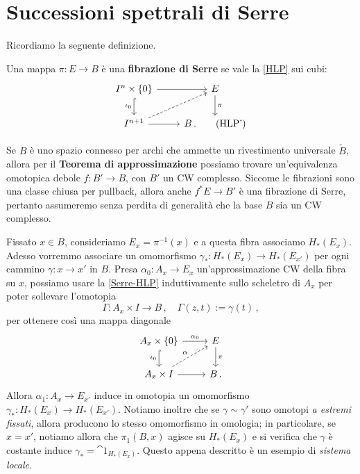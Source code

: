 \section{Successioni spettrali di Serre}

Ricordiamo la seguente definizione.

\begin{df}
	Una mappa $\pi : E \to B$ è una \textbf{fibrazione di Serre} se
	vale la \eqref{HLP} sui cubi:
	\begin{equation}\label{Serre-HLP}
		\begin{tikzcd}
			I^{n} \times \{0\} \ar[r] \ar[d, "\iota_{0}"', hook] & E \ar[d, "\pi"] \\
			I^{n+1} \ar[r] \ar[ur, dashed] & B\,. \tag{HLP'}
		\end{tikzcd}
	\end{equation}
\end{df}

Se $B$ è uno spazio connesso per archi che ammette un rivestimento universale $\widetilde{B}$,
allora per il \textbf{Teorema di approssimazione} possiamo trovare un'equivalenza
omotopica debole $f: B' \to B$, con $B'$ un CW complesso. Siccome le fibrazioni
sono una classe chiusa per pullback, allora anche $f^{*}E \to B'$ 
è una fibrazione di Serre, pertanto assumeremo 
senza perdita di generalità che la base $B$ sia un CW complesso.

Fissato $x \in B$, consideriamo  $E_{x} = \pi^{-1}(x)$ e
a questa fibra associamo $H_{*}(E_{x})$. 
Adesso vorremmo associare un omomorfismo 
$\gamma_{*} : H_{*}(E_{x}) \to H_{*}(E_{x'})$
per ogni cammino
$\gamma : x \to x'$ in $B$. 
Presa $\alpha_{0} : A_{x} \to E_{x}$ un'approssimazione CW della fibra su $x$,
possiamo usare la \eqref{Serre-HLP} induttivamente sullo scheletro di $A_{x}$
per poter sollevare l'omotopia 
\begin{equation*}
	\Gamma: A_{x} \times I \longrightarrow B\,, \quad
	\Gamma(z,t) := \gamma(t)\,,
\end{equation*}
per ottenere così una mappa diagonale
\begin{equation*}
	\begin{tikzcd}
		A_{x} \times \{0\} \ar[r, "\alpha_{0}"] \ar[d, "\iota_{0}"', hook] & E \ar[d, "\pi"] \\
		A_{x} \times I \ar[r] \ar[ur, dashed, "\alpha"] & B\,. 
	\end{tikzcd}
\end{equation*}
Allora $\alpha_{1} :A_{x} \to E_{x'}$ induce in omotopia un omomorfismo
$\gamma_{*} : H_{*}(E_{x}) \to H_{*}(E_{x'})$.
Notiamo inoltre che se $\gamma \sim \gamma'$ sono omotopi \emph{a estremi fissati},
allora producono lo stesso omomorfismo in omologia; in particolare,
se $x=x'$, notiamo allora che $\pi_{1}(B,x)$ agisce su
$H_{*}(E_{x})$ e si verifica che $\gamma$ è costante induce $\gamma_{*} = \cat{1}_{H_{*}(E_{x})}$.
Questo appena descritto è un esempio di \emph{sistema locale}.

